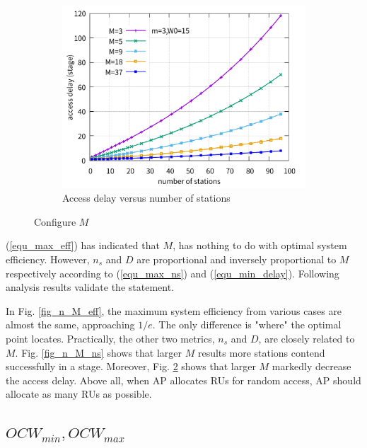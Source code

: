 \documentclass[journal]{IEEEtran}
\begin{document}
\begin{figure}[!t]
\begin{subfigure}{0.5\textwidth}  
\includegraphics[scale=.38]{./figure/Section_perf_eval/M/n_M_delay_perf.pdf}
\caption{Access delay versus number of stations}
\label{fig_n_M_delay}
\end{subfigure}
\caption{Configure $M$}
\end{figure}

(\ref{equ_max_eff}) has indicated that $M$, has nothing to do with optimal system efficiency. 
However, $n_s$ and $D$ are proportional and inversely proportional to $M$ respectively according to (\ref{equ_max_ns}) and (\ref{equ_min_delay}). 
Following analysis results validate the statement. 


In Fig. \ref{fig_n_M_eff}, the maximum system efficiency from various cases are almost the same, approaching $1/e$. 
The only difference is "where" the optimal point locates. 
Practically, the other two metrics, $n_s$ and $D$, are closely related to $M$.
Fig. \ref{fig_n_M_ns} shows that larger $M$ results more stations contend successfully in a stage.
Moreover, Fig. \ref{fig_n_M_delay} shows that larger $M$ markedly decrease the access delay. 
Above all, when AP allocates RUs for random access, AP should allocate as many RUs as possible.



\subsection{$OCW_{min}, OCW_{max}$}
\label{contend_window}
\end{document}
